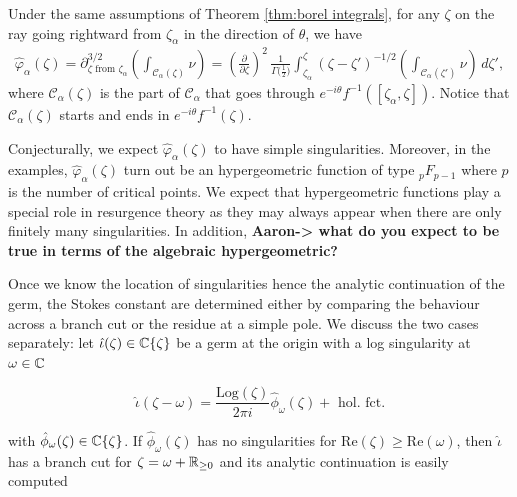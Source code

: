 \documentclass[11pt,a4paper,twoside,leqno,noamsfonts]{amsart}
\numberwithin{equation}{section}
\begin{document}
\begin{corollary}\label{cor:deriv-formula} 
Under the same assumptions of Theorem \ref{thm:borel integrals}, for any $\zeta$ on the ray going rightward from $\zeta_\alpha$ in the direction of $\theta$, we have
\begin{multline}
\hat{\varphi}_{\alpha}(\zeta)=\partial^{3/2}_{\zeta \text{ from }\zeta_\alpha} \left( \int_{\mathcal{C}_\alpha(\zeta)}\nu \right)={\left(\tfrac{\partial}{\partial \zeta}\right)^2}\,\frac{1}{\Gamma\big(\tfrac{1}{2}\big)} \int_{\zeta_\alpha}^\zeta (\zeta-\zeta')^{-1/2} {\left( \int_{\mathcal{C}_\alpha(\zeta')} \nu \right)}\,d\zeta',
\end{multline}
where $\mathcal{C}_\alpha(\zeta)$ is the part of $\mathcal{C}_\alpha$ that goes through $e^{-i\theta}f^{-1}([\zeta_\alpha, \zeta ])$. Notice that $\mathcal{C}_\alpha(\zeta)$ starts and ends in $e^{-i\theta}f^{-1}(\zeta)$. 
\end{corollary}

Conjecturally, we expect $\hat{\varphi}_\alpha(\zeta)$ to have simple singularities. Moreover, in the examples, $\hat{\varphi}_\alpha(\zeta)$ turn out be an hypergeometric function of type ${}_pF_{p-1}$ where $p$ is the number of critical points. 
We expect that hypergeometric functions play a special role in resurgence theory as they may always appear when there are only finitely many singularities. In addition,  \textbf{Aaron-> what do you expect to be true in terms of the algebraic hypergeometric?} 



Once we know the location of singularities hence the analytic continuation of the germ, the Stokes constant are determined either by comparing the behaviour across a branch cut or the residue at a simple pole. We discuss the two cases separately: let $\hat{\iota}(\zeta)\in\mathbb C\lbrace\zeta\rbrace$ be a germ at the origin with a log singularity at $\omega\in\mathbb C$

\begin{equation}
\hat{\iota}(\zeta-\omega)=\frac{\mathrm{Log}(\zeta)}{2\pi i}\hat{\phi}_{\omega}(\zeta)+\text{ hol. fct.}
\end{equation} 

with $\hat{\phi}_{\omega}(\zeta)\in\mathbb C\lbrace\zeta\rbrace$. If  $\hat{\phi}_{\omega}(\zeta)$ has no singularities for $\mathrm{Re}(\zeta)\geq \mathrm{Re}(\omega)$, then $\hat{\iota}$ has a branch cut for $\zeta=\omega+\mathbb R_{\geq 0}$  and its analytic continuation is easily computed
\end{document}
